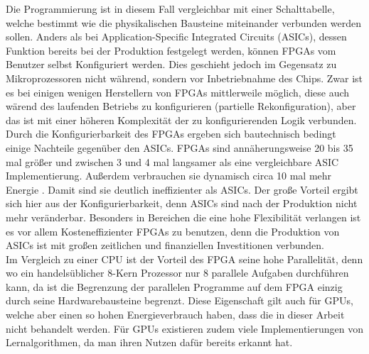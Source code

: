 Die Programmierung ist in diesem Fall vergleichbar mit einer Schalttabelle, welche bestimmt wie die physikalischen Bausteine miteinander verbunden werden sollen. Anders als bei Application-Specific Integrated Circuits
(ASICs), dessen Funktion bereits bei der Produktion festgelegt werden, können FPGAs vom Benutzer selbst Konfiguriert werden. \newpage 
Dies geschieht jedoch im Gegensatz zu Mikroprozessoren nicht während, sondern vor Inbetriebnahme des Chips. Zwar ist es bei
einigen wenigen Herstellern von FPGAs mittlerweile möglich, diese auch wärend des laufenden Betriebs zu konfigurieren (partielle Rekonfiguration), aber das ist mit einer höheren
Komplexität der zu konfigurierenden Logik verbunden.\\
Durch die Konfigurierbarkeit des FPGAs ergeben sich bautechnisch bedingt einige Nachteile gegenüber den ASICs. FPGAs sind annäherungsweise 20 bis 35 mal größer und zwischen 3 und 4 mal langsamer als eine vergleichbare ASIC Implementierung. Außerdem verbrauchen sie dynamisch circa 10 mal mehr Energie \cite{KURO}.
Damit sind sie deutlich ineffizienter als ASICs. Der große Vorteil ergibt sich hier aus der Konfigurierbarkeit, denn ASICs sind nach der Produktion nicht mehr veränderbar. Besonders in Bereichen die eine hohe Flexibilität verlangen ist es vor allem Kosteneffizienter FPGAs zu benutzen, denn die Produktion von ASICs ist mit großen zeitlichen und finanziellen Investitionen verbunden\cite{KUTERO}.\\
Im Vergleich zu einer CPU ist der Vorteil des FPGA seine hohe Parallelität, denn wo ein handelsüblicher 8-Kern Prozessor nur 8 parallele Aufgaben durchführen kann, da ist die Begrenzung der parallelen Programme auf dem FPGA einzig durch seine Hardwarebausteine begrenzt. Diese Eigenschaft gilt auch für GPUs, welche aber einen so hohen Energieverbrauch haben, dass die in dieser Arbeit nicht behandelt werden. Für GPUs existieren zudem viele Implementierungen von Lernalgorithmen, da man ihren Nutzen dafür bereits erkannt hat.
